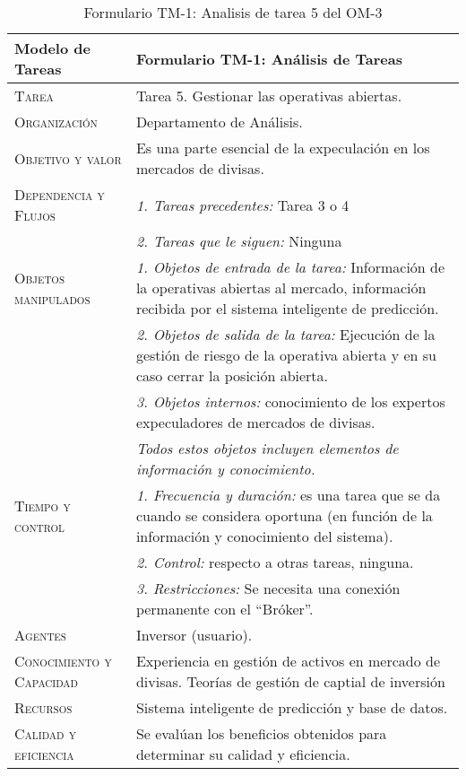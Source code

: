 \begin{table}[H]
	\scriptsize
	\begin{tabularx}{\textwidth}{|l|X|} 
		\hline	
		\textbf{Modelo de Tareas} & \textbf{Formulario TM-1: Análisis de Tareas} \\ 
		\hline\hline
		\textsc{Tarea} & Tarea 5. Gestionar las operativas abiertas.\\ 
		\hline
		\textsc{Organización}  & Departamento de Análisis.\\ 
		\hline
		\textsc{Objetivo y valor} &  Es una parte esencial de la expeculación en los mercados de divisas.\\ 
		\hline
		\textsc{Dependencia y Flujos} & \textit{1. Tareas precedentes:} Tarea 3 o 4\\ &  \textit{2. Tareas que le siguen:} Ninguna \\
		\hline
		\textsc{Objetos manipulados} & \textit{1. Objetos de entrada de la tarea:} Información de la operativas abiertas al mercado, información recibida por el sistema inteligente de predicción.\\ & \textit{2. Objetos de salida de la tarea:} Ejecución de la gestión de riesgo de la operativa abierta y en su caso cerrar la posición abierta.\\  & \textit{3. Objetos internos:} conocimiento de los  expertos expeculadores de mercados de divisas. \\ & \emph{Todos estos objetos incluyen elementos de información y conocimiento.}\\
		\hline
		\textsc{Tiempo y control} & \textit{1. Frecuencia y duración:} es una tarea que se da cuando se considera  oportuna (en función de la información y conocimiento del sistema).\\ & \textit{2. Control:} respecto a otras  tareas, ninguna.\\ & \textit{3. Restricciones:} Se necesita una conexión permanente con el ``Bróker''. \\
		\hline
		\textsc{Agentes} & Inversor (usuario).\\
		\hline
		\textsc{Conocimiento y Capacidad} & Experiencia en gestión de activos en mercado de divisas. Teorías de gestión de captial de inversión\\
		\hline
		\textsc{Recursos} & Sistema inteligente de predicción y  base de datos. \\
		\hline
		\textsc{Calidad y eficiencia} & Se evalúan los beneficios obtenidos para determinar su calidad y eficiencia. \\
		\hline
	\end{tabularx}
	\caption{\label{tab:TM1T4}Formulario TM-1: Analisis de tarea 5 del OM-3}
\end{table} 

